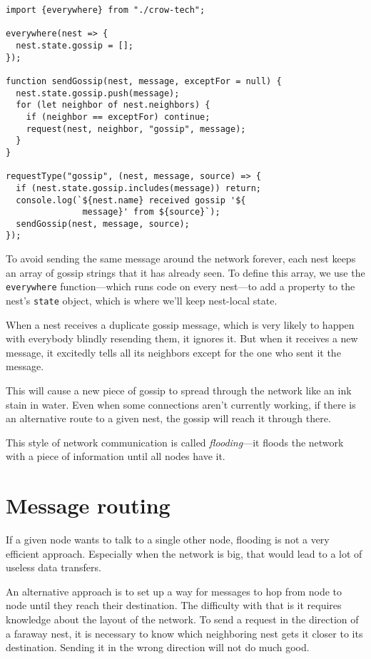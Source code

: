 \begin{lstlisting}
import {everywhere} from "./crow-tech";

everywhere(nest => {
  nest.state.gossip = [];
});

function sendGossip(nest, message, exceptFor = null) {
  nest.state.gossip.push(message);
  for (let neighbor of nest.neighbors) {
    if (neighbor == exceptFor) continue;
    request(nest, neighbor, "gossip", message);
  }
}

requestType("gossip", (nest, message, source) => {
  if (nest.state.gossip.includes(message)) return;
  console.log(`${nest.name} received gossip '${
               message}' from ${source}`);
  sendGossip(nest, message, source);
});
\end{lstlisting}
\noindent{}

To avoid sending the same message around the network forever, each nest keeps an array of gossip strings that it has already seen. To define this array, we use the \lstinline`everywhere` function—which runs code on every nest—to add a property to the nest's \lstinline`state` object, which is where we'll keep nest-local state.

When a nest receives a duplicate gossip message, which is very likely to happen with everybody blindly resending them, it ignores it. But when it receives a new message, it excitedly tells all its neighbors except for the one who sent it the message.

This will cause a new piece of gossip to spread through the network like an ink stain in water. Even when some connections aren't currently working, if there is an alternative route to a given nest, the gossip will reach it through there.

This style of network communication is called \emph{flooding}—it floods the network with a piece of information until all nodes have it.

\section{Message routing}

If a given node wants to talk to a single other node, flooding is not a very efficient approach. Especially when the network is big, that would lead to a lot of useless data transfers.

An alternative approach is to set up a way for messages to hop from node to node until they reach their destination. The difficulty with that is it requires knowledge about the layout of the network. To send a request in the direction of a faraway nest, it is necessary to know which neighboring nest gets it closer to its destination. Sending it in the wrong direction will not do much good.

